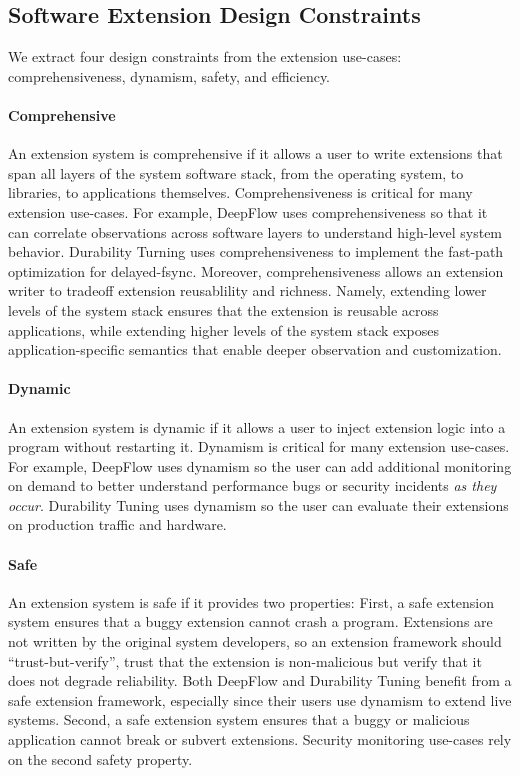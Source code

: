\subsection{Software Extension Design Constraints} \label{sec:motivation:constraints}

We extract four design constraints from the extension use-cases: comprehensiveness, dynamism, safety, and efficiency.

\paragraph{Comprehensive} 
An extension system is comprehensive if it allows a user to write extensions that span all layers of the system software stack, from the operating system, to libraries, to applications themselves.  Comprehensiveness is critical for many extension use-cases.  For example, DeepFlow uses comprehensiveness so that it can correlate observations across software layers to understand high-level system behavior.  Durability Turning uses comprehensiveness to implement the fast-path optimization for delayed-fsync.  Moreover, comprehensiveness allows an extension writer to tradeoff extension reusablility and richness.  Namely, extending lower levels of the system stack ensures that the extension is reusable across applications, while extending higher levels of the system stack exposes application-specific semantics that enable deeper observation and customization.

\paragraph{Dynamic}
An extension system is dynamic if it allows a user to inject extension logic into a program without restarting it.  Dynamism is critical for many extension use-cases.  For example, DeepFlow uses dynamism so the user can add additional monitoring on demand to better understand performance bugs or security incidents \emph{as they occur}.  Durability Tuning uses dynamism so the user can evaluate their extensions on production traffic and hardware.

\paragraph{Safe}
An extension system is safe if it provides two properties:  First, a safe extension system ensures that a buggy extension cannot crash a program.  Extensions are not written by the original system developers, so an extension framework should ``trust-but-verify'', trust that the extension is non-malicious but verify that it does not degrade reliability.  Both DeepFlow and Durability Tuning benefit from a safe extension framework, especially since their users use dynamism to extend live systems.  Second, a safe extension system ensures that a buggy or malicious application cannot break or subvert extensions.  Security monitoring use-cases rely on the second safety property.

